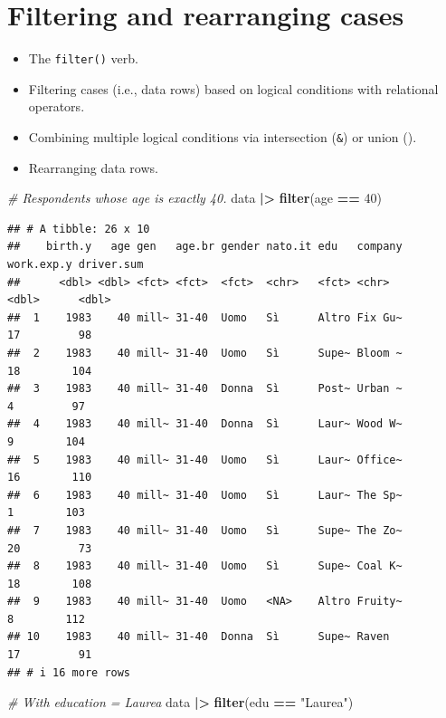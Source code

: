 \documentclass[
]{book}
\newenvironment{Shaded}{\begin{snugshade}}{\end{snugshade}}
\newcommand{\CommentTok}[1]{\textcolor[rgb]{0.56,0.35,0.01}{\textit{#1}}}
\newcommand{\DecValTok}[1]{\textcolor[rgb]{0.00,0.00,0.81}{#1}}
\newcommand{\FunctionTok}[1]{\textcolor[rgb]{0.13,0.29,0.53}{\textbf{#1}}}
\newcommand{\NormalTok}[1]{#1}
\newcommand{\SpecialCharTok}[1]{\textcolor[rgb]{0.81,0.36,0.00}{\textbf{#1}}}
\newcommand{\StringTok}[1]{\textcolor[rgb]{0.31,0.60,0.02}{#1}}
\providecommand{\tightlist}{%
  \setlength{\itemsep}{0pt}\setlength{\parskip}{0pt}}
\begin{document}
\hypertarget{filtering-and-rearranging-cases}{%
\section{Filtering and rearranging cases}\label{filtering-and-rearranging-cases}}

\begin{itemize}
\tightlist
\item
  The \texttt{filter()} verb.
\item
  Filtering cases (i.e., data rows) based on logical conditions with relational operators.
\item
  Combining multiple logical conditions via intersection (\texttt{\&}) or union (\texttt{\textbar{}}).
\item
  Rearranging data rows.
\end{itemize}

\begin{Shaded}
\begin{Highlighting}[]
\CommentTok{\# Respondents whose age is exactly 40.}
\NormalTok{data }\SpecialCharTok{|\textgreater{}} 
  \FunctionTok{filter}\NormalTok{(age }\SpecialCharTok{==} \DecValTok{40}\NormalTok{)}
\end{Highlighting}
\end{Shaded}

\begin{verbatim}
## # A tibble: 26 x 10
##    birth.y   age gen   age.br gender nato.it edu   company work.exp.y driver.sum
##      <dbl> <dbl> <fct> <fct>  <fct>  <chr>   <fct> <chr>        <dbl>      <dbl>
##  1    1983    40 mill~ 31-40  Uomo   Sì      Altro Fix Gu~         17         98
##  2    1983    40 mill~ 31-40  Uomo   Sì      Supe~ Bloom ~         18        104
##  3    1983    40 mill~ 31-40  Donna  Sì      Post~ Urban ~          4         97
##  4    1983    40 mill~ 31-40  Donna  Sì      Laur~ Wood W~          9        104
##  5    1983    40 mill~ 31-40  Uomo   Sì      Laur~ Office~         16        110
##  6    1983    40 mill~ 31-40  Uomo   Sì      Laur~ The Sp~          1        103
##  7    1983    40 mill~ 31-40  Uomo   Sì      Supe~ The Zo~         20         73
##  8    1983    40 mill~ 31-40  Uomo   Sì      Supe~ Coal K~         18        108
##  9    1983    40 mill~ 31-40  Uomo   <NA>    Altro Fruity~          8        112
## 10    1983    40 mill~ 31-40  Donna  Sì      Supe~ Raven           17         91
## # i 16 more rows
\end{verbatim}

\begin{Shaded}
\begin{Highlighting}[]
\CommentTok{\# With education = Laurea}
\NormalTok{data }\SpecialCharTok{|\textgreater{}} 
  \FunctionTok{filter}\NormalTok{(edu }\SpecialCharTok{==} \StringTok{"Laurea"}\NormalTok{)}
\end{Highlighting}
\end{Shaded}
\end{document}
